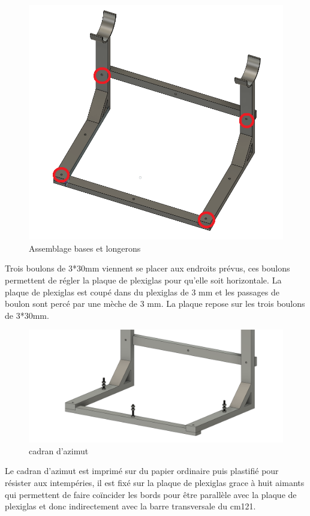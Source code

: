\documentclass[12pt,a4paper]{article}
\begin{document}
\begin{flushleft}
\begin{figure}[H]
\centering
\includegraphics[width=12cm]{image/montage/boussole_solaire/2.png} 
\caption{Assemblage bases et longerons}
\end{figure}

Trois boulons de 3*30mm viennent se placer aux endroits prévus, ces boulons permettent de régler la plaque de plexiglas pour qu'elle soit horizontale. La plaque de plexiglas est coupé dans du plexiglas de 3 mm et les passages de boulon sont percé par une mèche de 3 mm. La plaque repose sur les trois boulons de 3*30mm.\\

\begin{figure}[H]
\centering
\includegraphics[width=12cm]{image/montage/boussole_solaire/6.png} 
\caption{cadran d'azimut}
\end{figure}

Le cadran d'azimut est imprimé sur du papier ordinaire puis plastifié pour résister aux intempéries, il est fixé sur la plaque de plexiglas grace à huit aimants qui permettent de faire coïncider les bords pour être parallèle avec la plaque de plexiglas et donc indirectement avec la barre transversale du cm121.\\


\end{flushleft}
\end{document}
